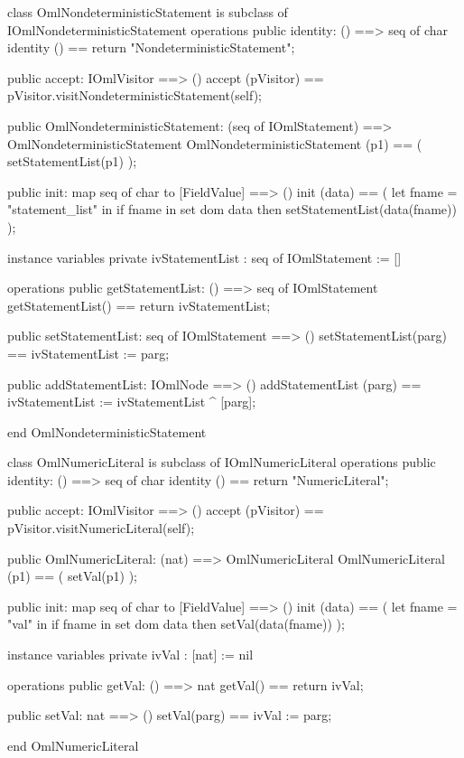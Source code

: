\begin{vdm_al}
class OmlNondeterministicStatement is subclass of IOmlNondeterministicStatement
operations
  public identity: () ==> seq of char
  identity () == return "NondeterministicStatement";

  public accept: IOmlVisitor ==> ()
  accept (pVisitor) == pVisitor.visitNondeterministicStatement(self);

  public OmlNondeterministicStatement:
      (seq of IOmlStatement) ==> OmlNondeterministicStatement
  OmlNondeterministicStatement (p1) == 
   ( setStatementList(p1) );

  public init: map seq of char to [FieldValue] ==> ()
  init (data) ==
    ( let fname = "statement_list" in
        if fname in set dom data
        then setStatementList(data(fname)) );

instance variables
  private ivStatementList : seq of IOmlStatement := []

operations
  public getStatementList: () ==> seq of IOmlStatement
  getStatementList() == return ivStatementList;

  public setStatementList: seq of IOmlStatement ==> ()
  setStatementList(parg) == ivStatementList := parg;

  public addStatementList: IOmlNode ==> ()
  addStatementList (parg) == ivStatementList := ivStatementList ^ [parg];

end OmlNondeterministicStatement
\end{vdm_al}

\begin{vdm_al}
class OmlNumericLiteral is subclass of IOmlNumericLiteral
operations
  public identity: () ==> seq of char
  identity () == return "NumericLiteral";

  public accept: IOmlVisitor ==> ()
  accept (pVisitor) == pVisitor.visitNumericLiteral(self);

  public OmlNumericLiteral:
      (nat) ==> OmlNumericLiteral
  OmlNumericLiteral (p1) == 
   ( setVal(p1) );

  public init: map seq of char to [FieldValue] ==> ()
  init (data) ==
    ( let fname = "val" in
        if fname in set dom data
        then setVal(data(fname)) );

instance variables
  private ivVal : [nat] := nil

operations
  public getVal: () ==> nat
  getVal() == return ivVal;

  public setVal: nat ==> ()
  setVal(parg) == ivVal := parg;

end OmlNumericLiteral
\end{vdm_al}

